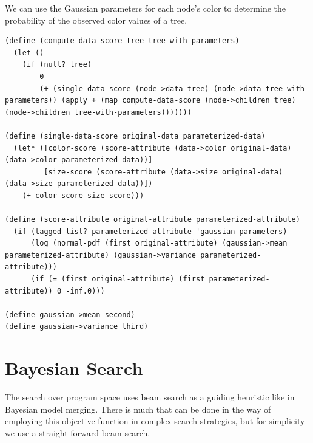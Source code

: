 \documentclass[a4paper,10pt]{article}
\begin{document}
We can use the Gaussian parameters for each node's color to determine the probability of the observed color values of a tree.
\begin{lstlisting}[frame=trBL]
(define (compute-data-score tree tree-with-parameters)
  (let ()
    (if (null? tree)
        0
        (+ (single-data-score (node->data tree) (node->data tree-with-parameters)) (apply + (map compute-data-score (node->children tree) (node->children tree-with-parameters)))))))

(define (single-data-score original-data parameterized-data)
  (let* ([color-score (score-attribute (data->color original-data) (data->color parameterized-data))]
         [size-score (score-attribute (data->size original-data) (data->size parameterized-data))])
    (+ color-score size-score)))

(define (score-attribute original-attribute parameterized-attribute)
  (if (tagged-list? parameterized-attribute 'gaussian-parameters)
      (log (normal-pdf (first original-attribute) (gaussian->mean parameterized-attribute) (gaussian->variance parameterized-attribute)))
      (if (= (first original-attribute) (first parameterized-attribute)) 0 -inf.0)))

(define gaussian->mean second)
(define gaussian->variance third)
\end{lstlisting}

\section{Bayesian Search}
The search over program space uses beam search as a guiding heuristic like in Bayesian model merging.  There is much that can be done in the way of employing this objective function in complex search strategies, but for simplicity we use a straight-forward beam search.  
\end{document}
